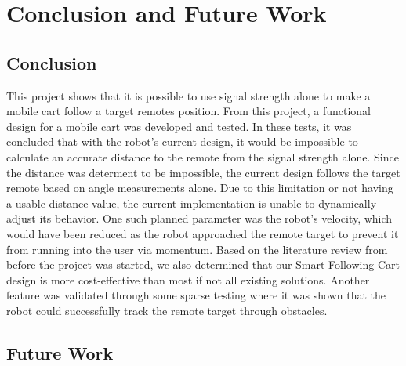 \chapter{Conclusion and Future Work}
\label{ch: Chapter6}
\label{ch: conclusionAndFuture}

\section{Conclusion}

This project shows that it is possible to use signal strength alone to make a mobile cart follow a target remotes position.  From this project, a functional design for a mobile cart was developed and tested.  In these tests, it was concluded that with the robot's current design, it would be impossible to calculate an accurate distance to the remote from the signal strength alone.  Since the distance was determent to be impossible, the current design follows the target remote based on angle measurements alone.  Due to this limitation or not having a usable distance value, the current implementation is unable to dynamically adjust its behavior. One such planned parameter was the robot's velocity, which would have been reduced as the robot approached the remote target to prevent it from running into the user via momentum.  Based on the literature review from before the project was started, we also determined that our Smart Following Cart design is more cost-effective than most if not all existing solutions.  Another feature was validated through some sparse testing where it was shown that the robot could successfully track the remote target through obstacles.

\section{Future Work}

